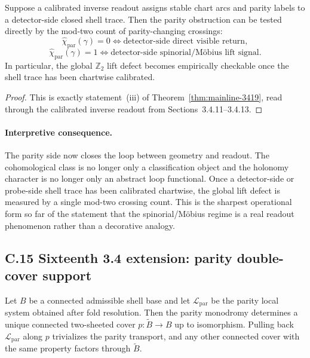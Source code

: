 \begin{corollary}
\label{cor:mainline-3419}
Suppose a calibrated inverse readout assigns stable chart arcs and parity labels to a detector-side closed shell trace. Then the parity obstruction can be tested directly by the mod-two count of parity-changing crossings:
\[
  \widehat\chi_{\mathrm{par}}(\gamma)=0
  \Longleftrightarrow
  \text{detector-side direct visible return},
\]
\[
  \widehat\chi_{\mathrm{par}}(\gamma)=1
  \Longleftrightarrow
  \text{detector-side spinorial/M\"obius lift signal}.
\]
In particular, the global $\mathbb Z_2$ lift defect becomes empirically checkable once the shell trace has been chartwise calibrated.
\end{corollary}

\begin{proof}
This is exactly statement~(iii) of Theorem~\ref{thm:mainline-3419}, read through the calibrated inverse readout from Sections~3.4.11--3.4.13.
\end{proof}

\paragraph{Interpretive consequence.}
The parity side now closes the loop between geometry and readout. The cohomological class is no longer only a classification object and the holonomy character is no longer only an abstract loop functional. Once a detector-side or probe-side shell trace has been calibrated chartwise, the global lift defect is measured by a single mod-two crossing count. This is the sharpest operational form so far of the statement that the spinorial/M\"obius regime is a real readout phenomenon rather than a decorative analogy.


\subsection*{C.15 Sixteenth 3.4 extension: parity double-cover support}

\begin{theorem}
\label{thm:appendix-3416}
Let $B$ be a connected admissible shell base and let $\mathcal L_{\mathrm{par}}$ be the parity local system obtained after fold resolution. Then the parity monodromy determines a unique connected two-sheeted cover $p:\widetilde B\to B$ up to isomorphism. Pulling back $\mathcal L_{\mathrm{par}}$ along $p$ trivializes the parity transport, and any other connected cover with the same property factors through $\widetilde B$.
\end{theorem}

